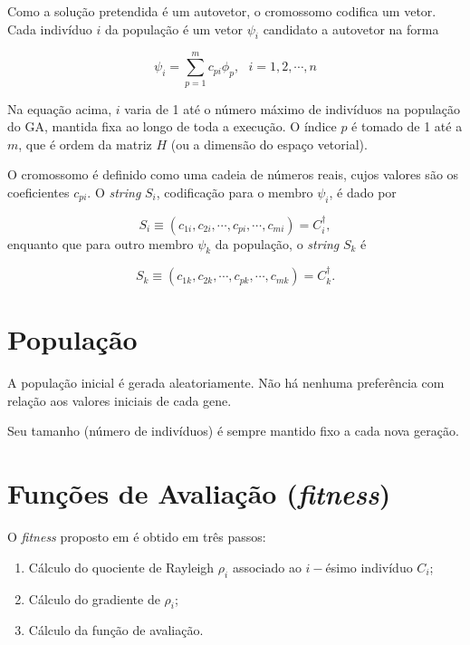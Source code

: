 	Como a solução pretendida é um autovetor, o cromossomo codifica um vetor. Cada indivíduo $i$ da população é um vetor $\psi_i$ candidato a autovetor na forma
	
	\begin{equation}
		\psi_i = \sum_{p=1}^m c_{pi}\phi_p, \mbox{   } i = 1,2, \cdots, n
	\end{equation}
	
	Na equação acima, $i$ varia de 1 até o número máximo de indivíduos na população do GA, mantida fixa ao longo de toda a execução. O índice $p$ é tomado de 1 até a $m$, que é ordem da matriz $H$ (ou a dimensão do espaço vetorial).
	
	O cromossomo é definido como uma cadeia de números reais, cujos valores são os coeficientes $c_{pi}$. O \emph{string} $S_i$, codificação para o membro $\psi_i$, é dado por
	
	\begin{equation}
		S_i \equiv  (c_{1i}, c_{2i}, \cdots, c_{pi}, \cdots, c_{mi}) = C^{\dagger}_i,
	\end{equation}
	enquanto que para outro membro $\psi_k$ da população, o \emph{string} $S_k$ é
	
	\begin{equation}
		S_k \equiv  (c_{1k}, c_{2k}, \cdots, c_{pk}, \cdots, c_{mk}) = C^{\dagger}_k.
	\end{equation}
	
	\section{População}

	A população inicial é gerada aleatoriamente. Não há nenhuma preferência com relação aos valores iniciais de cada gene.
	
	Seu tamanho (número de indivíduos) é sempre mantido fixo a cada nova geração.
	
	\section{Funções de Avaliação (\emph{fitness})}
	\label{sec:fitness_metodo}

	O \emph{fitness} proposto em \cite{metodo2004} é obtido em três passos:
	
	\begin{enumerate}
		\item \label{item:passo1} Cálculo do quociente de Rayleigh $\rho_i$ associado ao $i-$ésimo indivíduo $C_i$;
		\item \label{item:passo2} Cálculo do gradiente de $\rho_i$;
		\item \label{item:passo3} Cálculo da função de avaliação.
	\end{enumerate}
	
